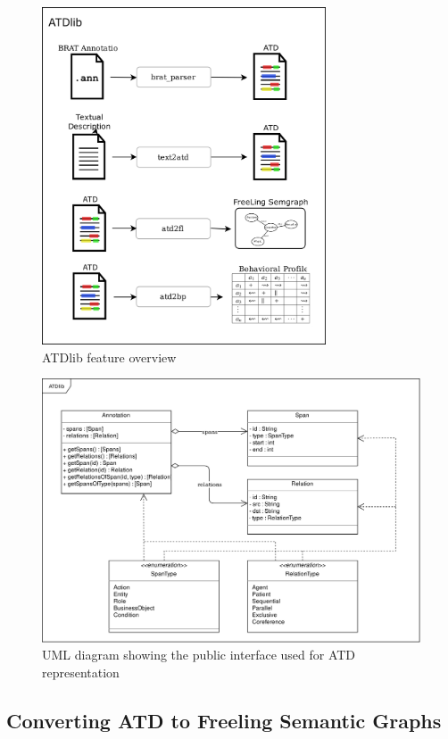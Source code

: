 \begin{figure}[htb]
  \centering
  \includegraphics[width=0.75\textwidth]{figures/atdlib_arch}
  \caption{ATDlib feature overview}
  \label{fig:atdlib_architecture}
\end{figure}


\begin{figure}[htb]
  \centering
  \includegraphics[width=\textwidth]{figures/atdlib_uml}
  \caption{UML diagram showing the public interface used for ATD representation}
  \label{fig:atdlib_uml}
\end{figure}

\subsection{Converting ATD to Freeling Semantic Graphs}

